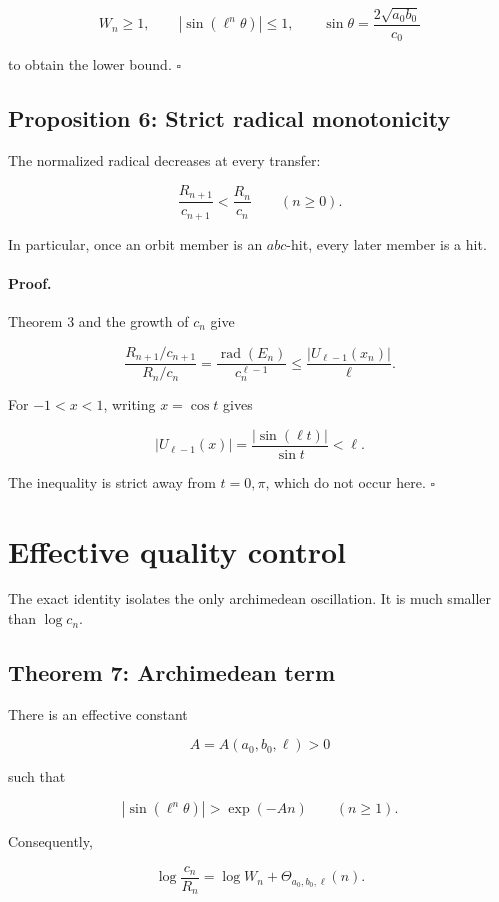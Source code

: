 \documentclass[11pt]{article}
\begin{document}
\[
W_n\geq1,
\qquad
|\sin(\ell^n\theta)|\leq1,
\qquad
\sin\theta=\frac{2\sqrt{a_0b_0}}{c_0}
\]

to obtain the lower bound. \(\square\)

\subsection{Proposition 6: Strict radical monotonicity}

The normalized radical decreases at every transfer:

\[
\frac{R_{n+1}}{c_{n+1}}
<
\frac{R_n}{c_n}
\qquad(n\geq0).
\]

In particular, once an orbit member is an \(abc\)-hit, every later member
is a hit.

\paragraph{Proof.}

Theorem 3 and the growth of \(c_n\) give

\[
\frac{R_{n+1}/c_{n+1}}
{R_n/c_n}
=
\frac{\operatorname{rad}(E_n)}
{c_n^{\ell-1}}
\leq
\frac{|U_{\ell-1}(x_n)|}{\ell}.
\]

For \(-1<x<1\), writing \(x=\cos t\) gives

\[
|U_{\ell-1}(x)|
=
\frac{|\sin(\ell t)|}{\sin t}
<
\ell.
\]

The inequality is strict away from \(t=0,\pi\), which do not occur here.
\(\square\)

\section{Effective quality control}

The exact identity isolates the only archimedean oscillation. It is much
smaller than \(\log c_n\).

\subsection{Theorem 7: Archimedean term}

There is an effective constant

\[
A=A(a_0,b_0,\ell)>0
\]

such that

\[
|\sin(\ell^n\theta)|
>
\exp(-An)
\qquad(n\geq1).
\]

Consequently,

\[
\log\frac{c_n}{R_n}
=
\log W_n
+
\Theta_{a_0,b_0,\ell}(n).
\]
\end{document}
